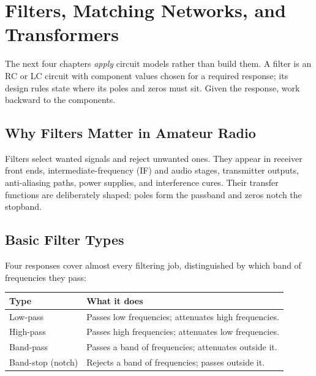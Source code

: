 \chapter{Filters, Matching Networks, and Transformers}
\label{ch:filters}
The next four chapters \emph{apply} circuit models rather than build them. A filter
is an RC or LC circuit with component values chosen for a
required response; its design rules state where its poles and zeros must sit.
Given the response, work backward to the components.

\section{Why Filters Matter in Amateur Radio}
Filters select wanted signals and reject unwanted ones. They appear in receiver
front ends, intermediate-frequency (IF) and audio stages, transmitter outputs,
anti-aliasing paths, power supplies, and interference cures. Their transfer
functions are deliberately shaped: poles form the passband and zeros notch the
stopband.

\section{Basic Filter Types}
Four responses cover almost every filtering job, distinguished by which band of
frequencies they pass:

\begin{center}
\begin{tabularx}{\textwidth}{@{}L{0.26\textwidth}Y@{}}
\toprule
Type & What it does \\
\midrule
Low-pass & Passes low frequencies; attenuates high frequencies. \\
High-pass & Passes high frequencies; attenuates low frequencies. \\
Band-pass & Passes a band of frequencies; attenuates outside it. \\
Band-stop (notch) & Rejects a band of frequencies; passes outside it. \\
\bottomrule
\end{tabularx}
\end{center}

